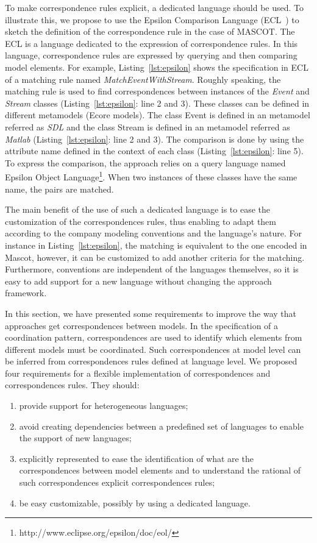 To make correspondence rules explicit, a dedicated language should be used. To illustrate this, we propose to use the Epsilon Comparison Language (ECL~\cite{epsilonbib}) to sketch the definition of the correspondence rule in the case of MASCOT. The ECL is a language dedicated to the expression of correspondence rules. In this language, correspondence rules are expressed by querying and then comparing model elements. For example, Listing~\ref{lst:epsilon} shows the specification in ECL of a matching rule named \emph{MatchEventWithStream}. Roughly speaking, the matching rule is used to find correspondences between instances of the \emph{Event} and \emph{Stream} classes (Listing~\ref{lst:epsilon}: line 2 and 3). These classes can be defined in different metamodels (\ie Ecore models). The class Event is defined in an metamodel referred as \emph{SDL} and the class Stream is defined in an metamodel referred as \emph{Matlab} (Listing~\ref{lst:epsilon}: line 2 and 3). The comparison is done by using the attribute name defined in the context of each class (Listing~\ref{lst:epsilon}: line 5). To express the comparison, the approach relies on a query language named Epsilon Object Language\footnote{http://www.eclipse.org/epsilon/doc/eol/}. When two instances of these classes have the same name, the pairs are matched.
	
The main benefit of the use of such a dedicated language is to ease the customization of the correspondences rules, thus enabling to adapt them according to the company modeling conventions and the language's nature. For instance in Listing~\ref{lst:epsilon}, the matching is equivalent to the one encoded in Mascot, however, it can be customized to add another criteria for the matching. Furthermore, conventions are independent of the languages themselves, so it is easy to add support for a new language without changing the approach framework.
	

In this section, we have presented some requirements to improve the way that approaches get correspondences between models. In the specification of a coordination pattern, correspondences are used to identify which elements from different models must be coordinated. Such correspondences at model level can be inferred from correspondences rules defined at language level. We proposed four requirements for a flexible implementation of correspondences and correspondences rules. They should: 
\begin{enumerate}
\item provide support for heterogeneous languages;
\item avoid creating dependencies between a predefined set of languages to enable the support of new languages;
\item explicitly represented to ease the identification of what are the correspondences between model elements and to understand the rational of such correspondences \ie explicit correspondences rules;
\item be easy customizable, possibly by using a dedicated language. %
\end{enumerate}

